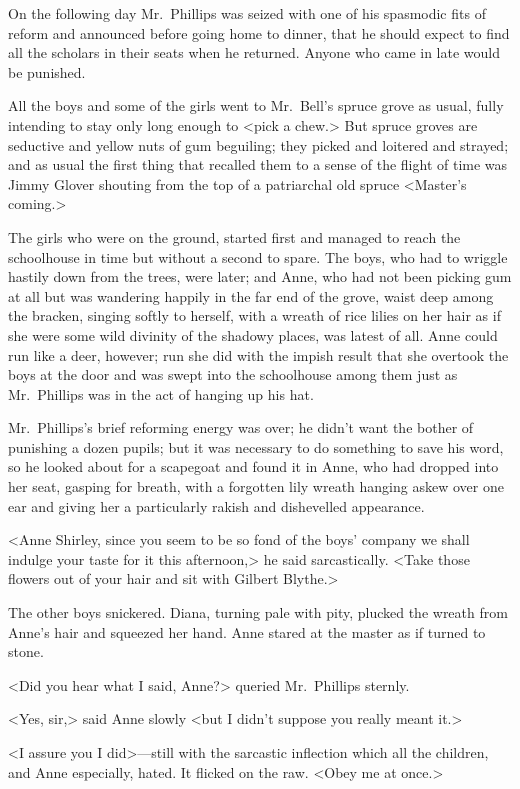 On the following day Mr.~Phillips was seized with one of his spasmodic fits of reform and announced before going home to dinner, that he should expect to find all the scholars in their seats when he returned. Anyone who came in late would be punished.

All the boys and some of the girls went to Mr.~Bell's spruce grove as usual, fully intending to stay only long enough to <pick a chew.> But spruce groves are seductive and yellow nuts of gum beguiling; they picked and loitered and strayed; and as usual the first thing that recalled them to a sense of the flight of time was Jimmy Glover shouting from the top of a patriarchal old spruce <Master's coming.>

The girls who were on the ground, started first and managed to reach the schoolhouse in time but without a second to spare. The boys, who had to wriggle hastily down from the trees, were later; and Anne, who had not been picking gum at all but was wandering happily in the far end of the grove, waist deep among the bracken, singing softly to herself, with a wreath of rice lilies on her hair as if she were some wild divinity of the shadowy places, was latest of all. Anne could run like a deer, however; run she did with the impish result that she overtook the boys at the door and was swept into the schoolhouse among them just as Mr.~Phillips was in the act of hanging up his hat.

Mr.~Phillips's brief reforming energy was over; he didn't want the bother of punishing a dozen pupils; but it was necessary to do something to save his word, so he looked about for a scapegoat and found it in Anne, who had dropped into her seat, gasping for breath, with a forgotten lily wreath hanging askew over one ear and giving her a particularly rakish and dishevelled appearance.

<Anne Shirley, since you seem to be so fond of the boys' company we shall indulge your taste for it this afternoon,> he said sarcastically. <Take those flowers out of your hair and sit with Gilbert Blythe.>

The other boys snickered. Diana, turning pale with pity, plucked the wreath from Anne's hair and squeezed her hand. Anne stared at the master as if turned to stone.

<Did you hear what I said, Anne?> queried Mr.~Phillips sternly.

<Yes, sir,> said Anne slowly <but I didn't suppose you really meant it.>

<I assure you I did>—still with the sarcastic inflection which all the children, and Anne especially, hated. It flicked on the raw. <Obey me at once.>

